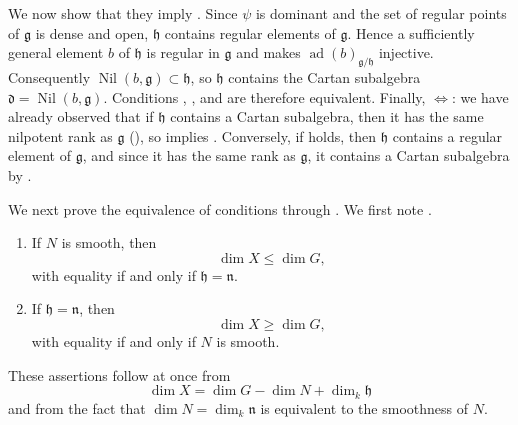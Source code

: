 We now show that they imply . Since \(\psi\) is dominant and the set
of regular points of \(\mathfrak g\) is dense and open, \(\mathfrak h\)
contains regular elements of \(\mathfrak g\). Hence a sufficiently
general element \(b\) of \(\mathfrak h\) is regular in \(\mathfrak g\)
and makes \(\operatorname{ad}(b)_{\mathfrak g/\mathfrak h}\)
injective. Consequently
\(\operatorname{Nil}(b,\mathfrak g)\subset\mathfrak h\), so
\(\mathfrak h\) contains the Cartan subalgebra
\(\mathfrak d=\operatorname{Nil}(b,\mathfrak g)\). Conditions ,
, and  are therefore equivalent. Finally,
\(\Longleftrightarrow\): we have already observed that if
\(\mathfrak h\) contains a Cartan subalgebra, then it has the same
nilpotent rank as \(\mathfrak g\) (), so  implies .
Conversely, if  holds, then \(\mathfrak h\) contains a regular
element of \(\mathfrak g\), and since it has the same rank as
\(\mathfrak g\), it contains a Cartan subalgebra by .

We next prove the equivalence of conditions  through . We
first note .

\begin{lemma}
\begin{enumerate}
  \item[a)]
  If \(N\) is smooth, then
  \[
    \dim X\leq\dim G,
  \]
  with equality if and only if \(\mathfrak h=\mathfrak n\).

  \item[b)]
  If \(\mathfrak h=\mathfrak n\), then
  \[
    \dim X\geq\dim G,
  \]
  with equality if and only if \(N\) is smooth.
\end{enumerate}
\end{lemma}

These assertions follow at once from 
\[
  \dim X=\dim G-\dim N+\dim_k\mathfrak h
\]
and from the fact that
\(\dim N=\dim_k\mathfrak n\) is equivalent to the smoothness of \(N\).

